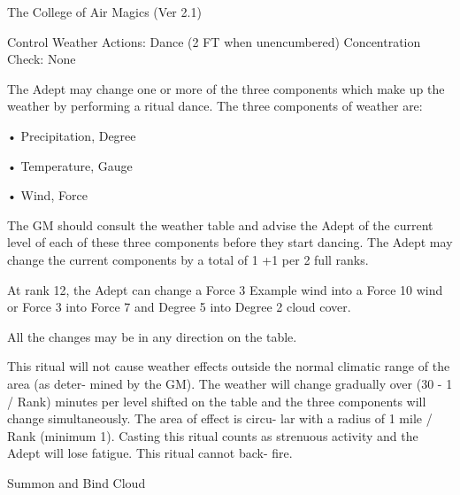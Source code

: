 \begin{Chapter}{The College of Air Magics (Ver 2.1)}
\begin{ritual}[R-3]{Control Weather }
Actions: Dance (2 FT when unencumbered) 
Concentration Check: None 
\begin{effects}
The Adept may change one or more of the 
three  components  which  make  up  the  weather  by 
performing a ritual dance. The three components of 
weather are:  

• Precipitation, Degree  

• Temperature, Gauge  

• Wind, Force 

The  GM  should  consult  the  weather  table  and 
advise  the  Adept  of  the  current  level  of  each  of 
these  three  components  before  they  start  dancing. 
The Adept may change the current components by 
a total of 1 +1 per 2 full ranks. 

At rank 12, the Adept can change a Force 3 
Example 
wind  into  a  Force  10  wind  or  Force  3  into  Force  7  and 
Degree 5 into Degree 2 cloud cover. 

All  the  changes  may  be  in  any  direction  on  the 
table. 

This  ritual  will  not  cause  weather  effects  outside 
the  normal  climatic  range  of  the  area  (as  deter-
mined  by  the  GM).  The  weather  will  change 
gradually  over  (30  -  1  /  Rank)  minutes  per  level 
shifted  on the  table  and  the  three  components  will 
change simultaneously. The area of effect is circu-
lar  with  a  radius  of  1  mile  /  Rank  (minimum  1). 
Casting this ritual counts as strenuous activity and 
the Adept will lose fatigue. This ritual cannot back-
fire. 

\end{effects}
\end{ritual}

\begin{ritual}[R-4]{Summon and Bind Cloud }



\end{ritual}
\end{Chapter}
